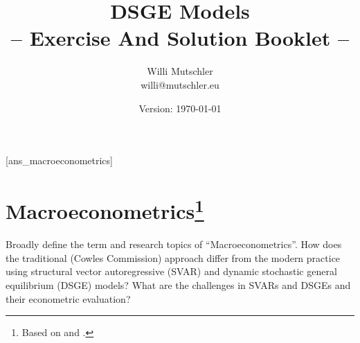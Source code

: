 \documentclass[a4paper]{scrartcl}
\newif\ifpartINTRO %
\newcommand{\myTitle}{%
					  DSGE Models
				     }
\begin{document}
	\title{\myTitle\\ -- Exercise And Solution Booklet --}
	\author{Willi Mutschler\\willi@mutschler.eu}
	\date{Version: \today}
	\maketitle\thispagestyle{empty}
	\newpage
	[ans_macroeconometrics]
	\renewcommand{\contentsname}{Overview}
	\tableofcontents\thispagestyle{empty}\newpage

\ifpartINTRO	%
\section[Macroeconometrics]{Macroeconometrics\footnote{Based on \cite{Schorfheide.2010} and \cite{FernandezVillaverdeRubioRamirez.2010}.}\label{ex:Macroeconometrics}}\setcounter{page}{1}
Broadly define the term and research topics of \enquote{Macroeconometrics}. How does the traditional (Cowles Commission) approach differ from the modern practice using structural vector autoregressive (SVAR) and dynamic stochastic general equilibrium (DSGE) models? What are the challenges in SVARs and DSGEs and their econometric evaluation?
\end{document}
